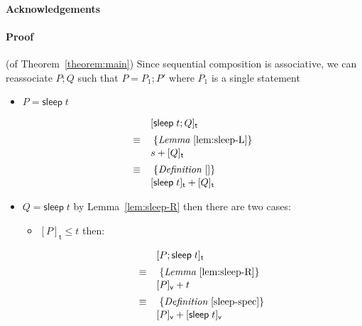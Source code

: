 \documentclass[preprint]{sigplanconf}
\renewcommand{\leq}{\leqslant}
\newcommand{\note}[1]{{\color{blue}{#1}}}
\theoremstyle{definition}
\newcommand{\sleep}{\mathsf{sleep}\;}
\newcommand{\vtime}[1]{[#1]_{\mathsf{v}}}
\newcommand{\etime}[1]{[#1]_{\mathsf{t}}}
\begin{document}
\note{TODO}

\paragraph{Acknowledgements}



\appendix



\paragraph{Proof} (of Theorem~\ref{theorem:main})
\note{These are just rough notes}
Since sequential composition is associative, we can reassociate
$P; Q$ such that $P = P_1; P'$ where $P_1$ is a single statement

\begin{itemize}
\item $P = \sleep t$

\begin{align*}
\begin{array}{ll}
       & \etime{\sleep t; Q} \\[0.5em]
\equiv & \; \{\textit{Lemma}~\ref{lem:sleep-L}\} \\[0.1em]
       & s + \etime{Q} \\[0.5em]
\equiv & \; \{\textit{Definition}~\ref{}\} \\[0.1em]
       & \etime{\sleep t} + \etime{Q}
\end{array}
\end{align*}

\item $Q = \sleep t$ by Lemma~\ref{lem:sleep-R} then 
there are two cases:

\begin{itemize}
\item $\etime{P} \leq t$ then:

\begin{align*}
\begin{array}{ll}
       & \etime{P; \sleep t} \\[0.5em]
\equiv & \; \{\textit{Lemma}~\ref{lem:sleep-R}\} \\[0.1em]
       & \vtime{P} + t \\[0.5em]
\equiv & \; \{\textit{Definition}~\ref{sleep-spec}\} \\[0.1em]
       & \vtime{P} + \vtime{\sleep t}
\end{array}
\end{align*}


\end{itemize}
\end{itemize}
\end{document}

